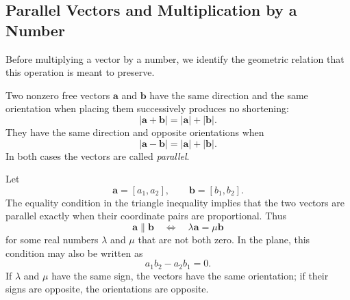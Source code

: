 \subsection{Parallel Vectors and Multiplication by a Number}

Before multiplying a vector by a number, we identify the geometric relation that
this operation is meant to preserve.

Two nonzero free vectors $\mathbf a$ and $\mathbf b$ have the same direction and
the same orientation when placing them successively produces no shortening:
\[
|\mathbf a+\mathbf b|=|\mathbf a|+|\mathbf b|.
\]
They have the same direction and opposite orientations when
\[
|\mathbf a-\mathbf b|=|\mathbf a|+|\mathbf b|.
\]
In both cases the vectors are called \emph{parallel}.

\begin{center}
\end{center}

Let
\[
\mathbf a=[a_1,a_2],
\qquad
\mathbf b=[b_1,b_2].
\]
The equality condition in the triangle inequality implies that the two vectors
are parallel exactly when their coordinate pairs are proportional. Thus
\[
\boxed{
\mathbf a\parallel\mathbf b
\quad\Longleftrightarrow\quad
\lambda\mathbf a=\mu\mathbf b
}
\]
for some real numbers $\lambda$ and $\mu$ that are not both zero. In the plane,
this condition may also be written as
\[
\boxed{
a_1b_2-a_2b_1=0
}.
\]
If $\lambda$ and $\mu$ have the same sign, the vectors have the same
orientation; if their signs are opposite, the orientations are opposite.

